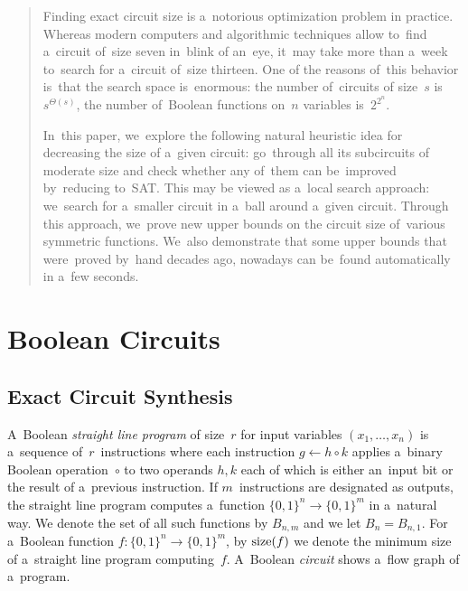 \maketitle

\begin{abstract}
Finding exact circuit size
is a~notorious optimization
problem in practice. Whereas modern computers
and algorithmic techniques allow to~find a~circuit
of~size seven in~blink of an~eye, it~may take more
than a~week to~search for a~circuit of~size thirteen.
One of the reasons of~this behavior is~that the search
space is~enormous: the number of~circuits of size~$s$
is~$s^{\Theta(s)}$, the number of~Boolean functions on~$n$ variables is~$2^{2^n}$.

In~this paper, we~explore the following natural
heuristic idea for decreasing the size of
a~given circuit: go~through all its subcircuits
of moderate size and check whether
any of~them can be~improved by~reducing to~SAT.
This may be viewed
as a~local search approach: we~search for a~smaller
circuit in a~ball around a~given circuit.
Through this approach, we~prove
new upper bounds on the circuit size
of~various symmetric functions. We~also demonstrate that
some upper bounds that were~proved by~hand
decades ago, nowadays can be~found automatically
in a~few seconds.
\end{abstract}





\section{Boolean Circuits}
\subsection{Exact Circuit Synthesis}

A~Boolean \emph{straight line program}
of size~$r$ for input variables $(x_1, \dotsc, x_n)$
is a~sequence of~$r$~instructions where each
instruction $g \gets h \circ k$
applies a~binary Boolean operation~$\circ$ to
two operands $h,k$ each of which is either an~input bit
or the result of a~previous instruction.
If $m$~instructions are designated as outputs,
the straight line program computes a~function
$\{0,1\}^n \to \{0,1\}^m$ in a~natural way.
We denote the set of all such functions by $B_{n,m}$ and we let $B_n=B_{n,1}$.
For
a~Boolean function $f \colon \{0,1\}^n \to \{0,1\}^m$,
by $\operatorname{size}(f)$ we denote the minimum size of
a~straight line program
computing~$f$. A~Boolean \emph{circuit}
shows a~flow graph of a~program.

